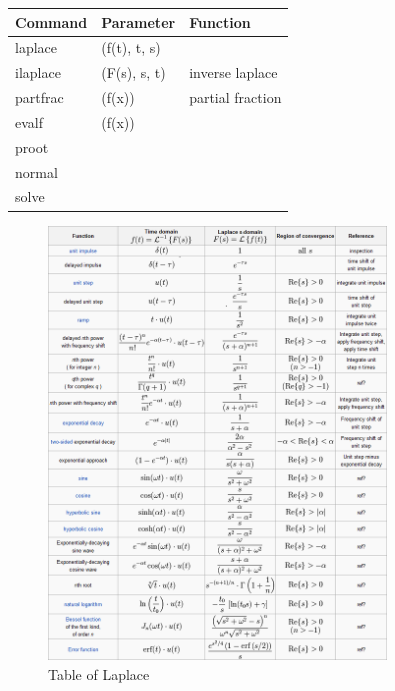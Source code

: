 \documentclass[10pt,landscape]{article}
\theoremstyle{definition}
\theoremstyle{remark}
\begin{document}
\begin{table}[h]
\centering
\begin{tabular}{|l|l|l|}
\hline
Command  & Parameter    & Function         \\ \hline
laplace  & (f(t), t, s) &                  \\ \hline
ilaplace & (F(s), s, t) & inverse laplace  \\ \hline
partfrac & (f(x))       & partial fraction \\ \hline
evalf    & (f(x))       &                  \\ \hline
proot    &              &                  \\ \hline
normal   &              &                  \\ \hline
solve    &              &                  \\ \hline
\end{tabular}%
\end{table}

\newpage
\begin{figure}
    \centering
    \includegraphics[width=0.8\textwidth,height=\textheight,keepaspectratio]{202/figure/lapace_table.png}
    \caption{Table of Laplace \cite{oneill}}
    \label{fig:lapace_tb_1}
\end{figure}
\end{document}
